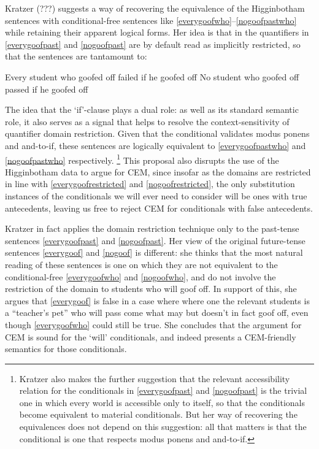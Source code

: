 \documentclass[If.tex]{subfiles}
\begin{document}
Kratzer (???) suggests a way of recovering the equivalence of the Higginbotham sentences with conditional-free sentences like \ref{everygoofwho}--\ref{nogoofpastwho} while retaining their apparent logical forms. Her idea is that in the quantifiers in \ref{everygoofpast} and \ref{nogoofpast} are by default read as implicitly restricted, so that the sentences are tantamount to:
\begin{prop}
	\nitem \label{everygoofrestricted}
	Every student who goofed off failed if he goofed off
	\nitem \label{nogoofrestricted}
	No student who goofed off passed if he goofed off
\end{prop}
The idea that the ‘if’-clause plays a dual role: as well as its standard semantic role, it also serves as a signal that helps to resolve the context-sensitivity of quantifier domain restriction. Given that the conditional validates modus ponens and and-to-if, these sentences are logically equivalent to \ref{everygoofpastwho}
and \ref{nogoofpastwho} respectively.%
\footnote{Kratzer also makes the further suggestion that the relevant accessibility relation for the conditionals in \ref{everygoofpast} and \ref{nogoofpast} is the trivial one in which every world is accessible only to itself, so that the conditionals become equivalent to material conditionals. But her way of recovering the equivalences does not depend on this suggestion: all that matters is that the conditional is one that respects modus ponens and and-to-if.}
This proposal also disrupts the use of the Higginbotham data to argue for CEM, since insofar as the domains are restricted in line with \ref{everygoofrestricted} and \ref{nogoofrestricted}, the only substitution instances of the conditionals we will ever need to consider will be ones with true antecedents, leaving us free to reject CEM for conditionals with false antecedents.

Kratzer in fact applies the domain restriction technique only to the past-tense sentences \ref{everygoofpast} and \ref{nogoofpast}. Her view of the original future-tense sentences \ref{everygoof} and \ref{nogoof} is different: she thinks that the most natural reading of these sentences is one on which they are not equivalent to the conditional-free \ref{everygoofwho} and \ref{nogoofwho}, and do not involve the restriction of the domain to students who will goof off. In support of this, she argues that \ref{everygoof} is false in a case where where one the relevant students is a ``teacher's pet'' who will pass come what may but doesn't in fact goof off, even though \ref{everygoofwho} could still be true. She concludes that the argument for CEM is sound for the ‘will’ conditionals, and indeed presents a CEM-friendly semantics for those conditionals.
\end{document}
